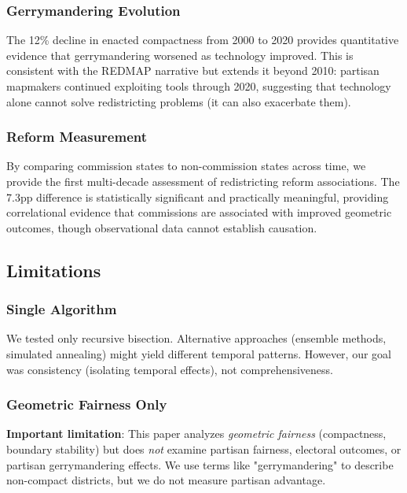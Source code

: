 \subsubsection{Gerrymandering Evolution}

The 12\% decline in enacted compactness from 2000 to 2020 provides quantitative evidence that gerrymandering worsened as technology improved. This is consistent with the REDMAP narrative but extends it beyond 2010: partisan mapmakers continued exploiting tools through 2020, suggesting that technology alone cannot solve redistricting problems (it can also exacerbate them).

\subsubsection{Reform Measurement}

By comparing commission states to non-commission states across time, we provide the first multi-decade assessment of redistricting reform associations. The 7.3pp difference is statistically significant and practically meaningful, providing correlational evidence that commissions are associated with improved geometric outcomes, though observational data cannot establish causation.

\subsection{Limitations}

\subsubsection{Single Algorithm}

We tested only recursive bisection. Alternative approaches (ensemble methods, simulated annealing) might yield different temporal patterns. However, our goal was consistency (isolating temporal effects), not comprehensiveness.

\subsubsection{Geometric Fairness Only}

\textbf{Important limitation}: This paper analyzes \textit{geometric fairness} (compactness, boundary stability) but does \textit{not} examine partisan fairness, electoral outcomes, or partisan gerrymandering effects. We use terms like "gerrymandering" to describe non-compact districts, but we do not measure partisan advantage.

